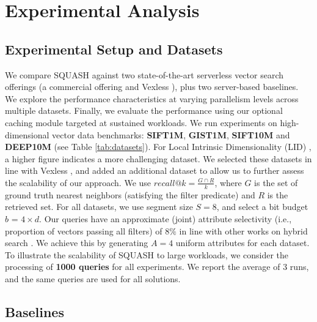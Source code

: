 \section{Experimental Analysis}
\label{s:5-squash-expts}

\subsection{Experimental Setup and Datasets}
We compare SQUASH against two state-of-the-art serverless vector search offerings (a commercial offering and Vexless \cite{Su2024Vexless}), plus two server-based baselines. We explore the performance characteristics at varying parallelism levels across multiple datasets. Finally, we evaluate the performance using our optional caching module targeted at sustained workloads. %
We run experiments on high-dimensional vector data benchmarks: \textbf{SIFT1M}, \textbf{GIST1M}, \textbf{SIFT10M} and \textbf{DEEP10M} (see Table \ref{tab:datasets}). 
For Local Intrinsic Dimensionality (LID) \cite{fu2021high-LID-Higher}, a higher figure indicates a more challenging dataset. 
We selected these datasets in line with Vexless \cite{Su2024Vexless}, and added an additional dataset to allow us to further assess the scalability of our approach. 
We use $recall@k = \frac{G \cap R}{k}$, where $G$ is the set of ground truth nearest neighbors (satisfying the filter predicate) and $R$ is the retrieved set.
For all datasets, we use segment size $S=8$, and select a bit budget $b$ = $4 \times d$. 
Our queries have an approximate (joint) attribute selectivity (i.e., proportion of vectors passing all filters) of $8\%$ in line with other works on hybrid search \cite{Patel2024ACORN}.
We achieve this by generating $A=4$ uniform attributes for each dataset.
To illustrate the scalability of SQUASH to large workloads, we consider the processing of \textbf{1000 queries} for all experiments. 
We report the average of 3 runs, and the same queries are used for all solutions. 



\subsection{Baselines}
\label{ss:7-baselines}

